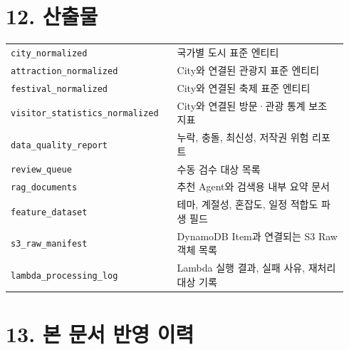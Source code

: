 \documentclass[12pt,a4paper]{article}
\newcommand{\DocNeedspace}[1]{\par\ifdim\dimexpr\pagegoal-\pagetotal\relax<#1\newpage\fi}
\begin{document}
\newpage

\DocNeedspace{10\baselineskip}
\section*{12. 산출물}


\DocNeedspace{26\baselineskip}
\begin{small}
\begin{longtable}{@{}>{\RaggedRight\arraybackslash}m{0.458\linewidth}>{\RaggedRight\arraybackslash}m{0.482\linewidth}@{}}
\toprule
\multicolumn{1}{>{\centering\arraybackslash}m{0.458\linewidth}}{\textbf{산출물}} & \multicolumn{1}{>{\centering\arraybackslash}m{0.482\linewidth}}{\textbf{설명}} \\
\midrule
\endhead
\texttt{city\_\allowbreak{}normalized} & 국가별 도시 표준 엔티티 \\
\texttt{attraction\_\allowbreak{}normalized} & City와 연결된 관광지 표준 엔티티 \\
\texttt{festival\_\allowbreak{}normalized} & City와 연결된 축제 표준 엔티티 \\
\texttt{visitor\_\allowbreak{}statistics\_\allowbreak{}normalized} & City와 연결된 방문·관광 통계 보조 지표 \\
\texttt{data\_\allowbreak{}quality\_\allowbreak{}report} & 누락, 충돌, 최신성, 저작권 위험 리포트 \\
\texttt{review\_\allowbreak{}queue} & 수동 검수 대상 목록 \\
\texttt{rag\_\allowbreak{}documents} & 추천 Agent와 검색용 내부 요약 문서 \\
\texttt{feature\_\allowbreak{}dataset} & 테마, 계절성, 혼잡도, 일정 적합도 파생 필드 \\
\texttt{s3\_\allowbreak{}raw\_\allowbreak{}manifest} & DynamoDB Item과 연결되는 S3 Raw 객체 목록 \\
\texttt{lambda\_\allowbreak{}processing\_\allowbreak{}log} & Lambda 실행 결과, 실패 사유, 재처리 대상 기록 \\
\bottomrule
\end{longtable}
\end{small}


\newpage

\DocNeedspace{10\baselineskip}
\section*{13. 본 문서 반영 이력}
\end{document}
